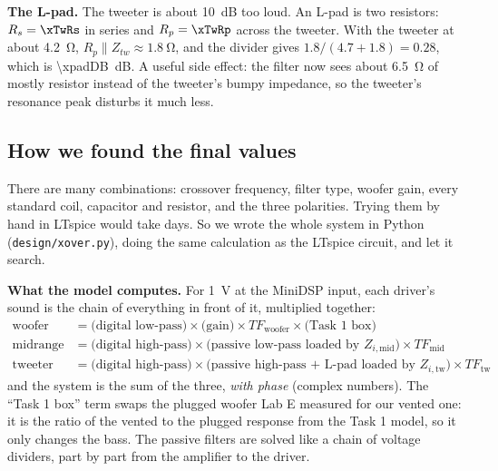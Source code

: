 \documentclass[a4paper,10pt]{article}
\newcommand{\file}[1]{\nolinkurl{#1}}
\begin{document}
\textbf{The L-pad.} The tweeter is about \SI{10}{dB} too loud. An L-pad is two resistors: $R_s =
\xTwRs$ in series and $R_p = \xTwRp$ across the tweeter. With the tweeter at about \SI{4.2}{\ohm},
$R_p \parallel Z_{tw} \approx \SI{1.8}{\ohm}$, and the divider gives
$1.8/(4.7 + 1.8) = 0.28$, which is \SI{\xpadDB}{dB}. A useful side effect: the filter now sees
about \SI{6.5}{\ohm} of mostly resistor instead of the tweeter's bumpy impedance, so the tweeter's
resonance peak disturbs it much less.

\subsection{How we found the final values}
There are many combinations: crossover frequency, filter type, woofer gain, every standard coil,
capacitor and resistor, and the three polarities. Trying them by hand in LTspice would take days. So
we wrote the whole system in Python (\file{design/xover.py}), doing the same calculation as the
LTspice circuit, and let it search.

\textbf{What the model computes.} For \SI{1}{V} at the MiniDSP input, each driver's sound is the chain
of everything in front of it, multiplied together:
\begin{align*}
\text{woofer} &= \text{(digital low-pass)} \times \text{(gain)} \times TF_\text{woofer} \times \text{(Task 1 box)}\\
\text{midrange} &= \text{(digital high-pass)} \times \text{(passive low-pass loaded by } Z_{i,\text{mid}}) \times TF_\text{mid}\\
\text{tweeter} &= \text{(digital high-pass)} \times \text{(passive high-pass + L-pad loaded by } Z_{i,\text{tw}}) \times TF_\text{tw}
\end{align*}
and the system is the sum of the three, \emph{with phase} (complex numbers). The ``Task 1 box'' term
swaps the plugged woofer Lab E measured for our vented one: it is the ratio of the vented to the
plugged response from the Task 1 model, so it only changes the bass. The passive filters are solved
like a chain of voltage dividers, part by part from the amplifier to the driver.
\end{document}
